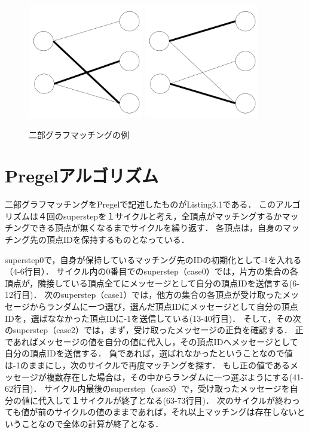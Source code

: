 \documentclass[12pt]{ujreport}
\begin{document}
\begin{figure}[ht]
  \centering
  \includegraphics[width=5cm]{二部グラフ例１.pdf}
  \includegraphics[width=5cm]{二部グラフ例２.pdf}
\caption{二部グラフマッチングの例}
\end{figure}

\section{Pregelアルゴリズム}
二部グラフマッチングをPregelで記述したものがListing3.1である．
このアルゴリズムは４回のsuperstepを１サイクルと考え，全頂点がマッチングするかマッチングできる頂点が無くなるまでサイクルを繰り返す．
各頂点は，自身のマッチング先の頂点IDを保持するものとなっている．

superstep0で，自身が保持しているマッチング先のIDの初期化として-1を入れる（4-6行目）．
サイクル内の0番目でのsuperstep（case0）では，片方の集合の各頂点が，隣接している頂点全てにメッセージとして自分の頂点IDを送信する(6-12行目)．
次のsuperstep（case1）では，他方の集合の各頂点が受け取ったメッセージからランダムに一つ選び，選んだ頂点IDにメッセージとして自分の頂点IDを，選ばななかった頂点IDに-1を送信している(13-40行目)．
そして，その次のsuperstep（case2）では，まず，受け取ったメッセージの正負を確認する．
正であればメッセージの値を自分の値に代入し，その頂点IDへメッセージとして自分の頂点IDを送信する．
負であれば，選ばれなかったということなので値は-1のままにし，次のサイクルで再度マッチングを探す．
もし正の値であるメッセージが複数存在した場合は，その中からランダムに一つ選ぶようにする(41-62行目)．
サイクル内最後のsuperstep（case3）で，受け取ったメッセージを自分の値に代入して１サイクルが終了となる(63-73行目)．
次のサイクルが終わっても値が前のサイクルの値のままであれば，それ以上マッチングは存在しないということなので全体の計算が終了となる．
\end{document}
